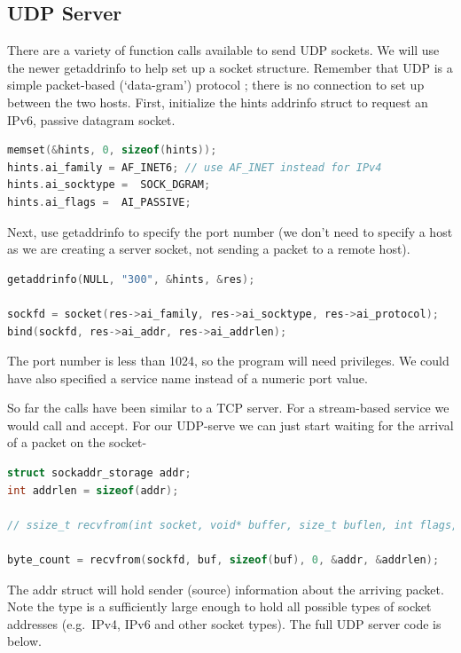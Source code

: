 \subsection{UDP Server}

There are a variety of function calls available to send UDP sockets.
We will use the newer getaddrinfo to help set up a socket structure.
Remember that UDP is a simple packet-based (`data-gram') protocol ; there is no connection to set up between the two hosts.
First, initialize the hints addrinfo struct to request an IPv6, passive datagram socket.

\begin{lstlisting}[language=C]
memset(&hints, 0, sizeof(hints));
hints.ai_family = AF_INET6; // use AF_INET instead for IPv4
hints.ai_socktype =  SOCK_DGRAM;
hints.ai_flags =  AI_PASSIVE;
\end{lstlisting}

Next, use getaddrinfo to specify the port number (we don't need to specify a host as we are creating a server socket, not sending a packet to a remote host).

\begin{lstlisting}[language=C]
getaddrinfo(NULL, "300", &hints, &res);

sockfd = socket(res->ai_family, res->ai_socktype, res->ai_protocol);
bind(sockfd, res->ai_addr, res->ai_addrlen);
\end{lstlisting}

The port number is less than 1024, so the program will need  privileges.
We could have also specified a service name instead of a numeric port value.

So far the calls have been similar to a TCP server.
For a stream-based service we would call  and accept.
For our UDP-serve we can just start waiting for the arrival of a packet on the socket-

\begin{lstlisting}[language=C]
struct sockaddr_storage addr;
int addrlen = sizeof(addr);

// ssize_t recvfrom(int socket, void* buffer, size_t buflen, int flags, struct sockaddr *addr, socklen_t * address_len);

byte_count = recvfrom(sockfd, buf, sizeof(buf), 0, &addr, &addrlen);
\end{lstlisting}

The addr struct will hold sender (source) information about the arriving packet.
Note the  type is a sufficiently large enough to hold all possible types of socket addresses (e.g.~IPv4, IPv6 and other socket types).
The full UDP server code is below.


